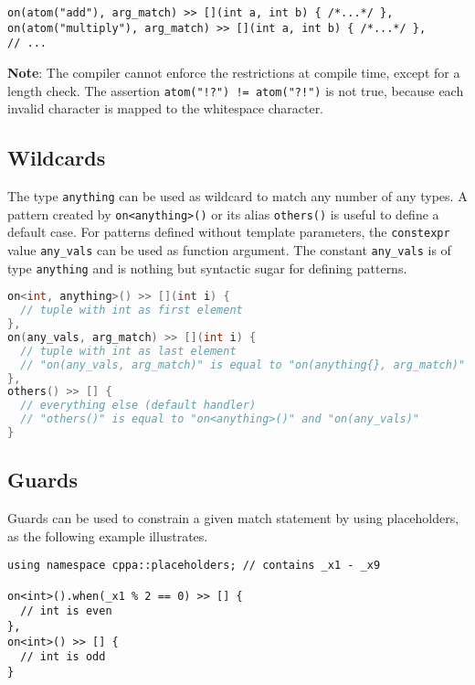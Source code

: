 \begin{lstlisting}
on(atom("add"), arg_match) >> [](int a, int b) { /*...*/ },
on(atom("multiply"), arg_match) >> [](int a, int b) { /*...*/ },
// ...
\end{lstlisting}

\textbf{Note}: The compiler cannot enforce the restrictions at compile time, except for a length check.
The assertion \lstinline^atom("!?") != atom("?!")^ is not true, because each invalid character is mapped to the whitespace character.

\clearpage
\subsection{Wildcards}
\label{Sec::PatternMatching::Wildcards}

The type \lstinline^anything^ can be used as wildcard to match any number of any types.
A pattern created by \lstinline^on<anything>()^ or its alias \lstinline^others()^ is useful to define a default case.
For patterns defined without template parameters, the \lstinline^constexpr^ value \lstinline^any_vals^ can be used as function argument.
The constant \lstinline^any_vals^ is of type \lstinline^anything^ and is nothing but syntactic sugar for defining patterns.

\begin{lstlisting}[language=C++]
on<int, anything>() >> [](int i) {
  // tuple with int as first element
},
on(any_vals, arg_match) >> [](int i) {
  // tuple with int as last element
  // "on(any_vals, arg_match)" is equal to "on(anything{}, arg_match)"
},
others() >> [] {
  // everything else (default handler)
  // "others()" is equal to "on<anything>()" and "on(any_vals)"
}
\end{lstlisting}

\subsection{Guards}

Guards can be used to constrain a given match statement by using placeholders, as the following example illustrates.

\begin{lstlisting}
using namespace cppa::placeholders; // contains _x1 - _x9

on<int>().when(_x1 % 2 == 0) >> [] {
  // int is even
},
on<int>() >> [] {
  // int is odd
}
\end{lstlisting}

